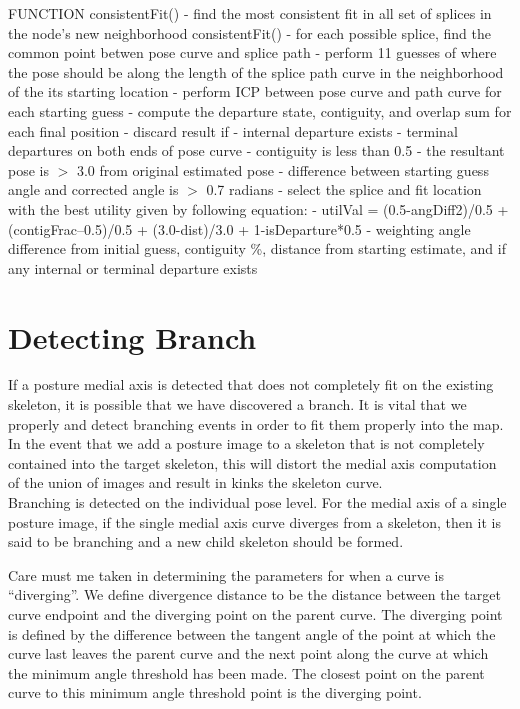FUNCTION
consistentFit()
 - find the most consistent fit in all set of splices in the node's new neighborhood consistentFit()
 - for each possible splice, find the common point betwen pose curve and splice path
 - perform 11 guesses of where the pose should be along the length of the splice path curve in the neighborhood of the its starting location
 - perform ICP between pose curve and path curve for each starting guess
 - compute the departure state, contiguity, and overlap sum for each final position
 - discard result if
 - internal departure exists
 - terminal departures on both ends of pose curve
 - contiguity is less than 0.5
 - the resultant pose is $>$ 3.0 from original estimated pose
 - difference between starting guess angle and corrected angle is $>$ 0.7 radians
 - select the splice and fit location with the best utility given by following equation:
 - utilVal = (0.5-angDiff2)\slash 0.5 + (contigFrac--0.5)\slash 0.5 + (3.0-dist)\slash 3.0 + 1-isDeparture*0.5
 - weighting angle difference from initial guess, contiguity \%, distance from starting estimate, and if any internal or terminal departure exists

\section{Detecting Branch}
\label{detectingbranch}

If a posture medial axis is detected that does not completely fit on the existing skeleton, it is possible that we have discovered a branch. It is vital that we properly and detect branching events in order to fit them properly into the map. In the event that we add a posture image to a skeleton that is not completely contained into the target skeleton, this will distort the medial axis computation of the union of images and result in kinks the skeleton curve.\\
Branching is detected on the individual pose level. For the medial axis of a single posture image, if the single medial axis curve diverges from a skeleton, then it is said to be branching and a new child skeleton should be formed.

Care must me taken in determining the parameters for when a curve is “diverging”. We define divergence distance to be the distance between the target curve endpoint and the diverging point on the parent curve. The diverging point is defined by the difference between the tangent angle of the point at which the curve last leaves the parent curve and the next point along the curve at which the minimum angle threshold has been made. The closest point on the parent curve to this minimum angle threshold point is the diverging point.

